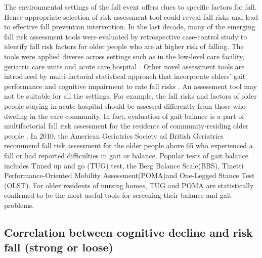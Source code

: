 \documentclass[conference,compsoc]{IEEEtran}
\begin{document}
The environmental settings of the fall event offers clues to specific factors for fall. Hence appropriate selection of risk assessment tool could reveal fall risks and lead to effective fall prevention intervention. In the last decade, many of the emerging fall risk assessment tools were evaluated by retrospective case-control study to identify fall risk factors for older people who are at higher risk of falling. The tools were applied diverse across settings such as in the low-level care facility\cite{van_Schooten_2020}, geriatric care units\cite{Michalcova_2020} and acute care hospital \cite{Chiu_2014, Aryee_2017}. Other novel assessment tools are introduced by multi-factorial statistical approach that incorporate elders' gait performance and cognitive impairment to rate fall risks \cite{Kikkert_2017,Taylor_2018}. An assessment tool may not be suitable for all the settings. For example, the fall risks and factors of older people staying in acute hospital should be assessed differently from those who dwellng in the care community. 
In fact, evaluation of gait balance is a part of multifactorial fall risk assessment for the residents of community-residing older people \cite{PreventionofFalls2011}. In 2010, the American Geriatrics Society ad British Geriatrics recommend fall risk assessment for the older people above 65 who experienced a fall or had reported difficulties in gait or balance. Popular tests of gait balance includes Timed up and go (TUG) test, the Berg Balance Scale(BBS), Tinetti Performance-Oriented Mobility Assessment(POMA)and One-Legged Stance Test (OLST). For older residents of nursing homes, TUG and POMA are statistically confirmed to be the most useful tools for screening their balance and gait problems\cite{Borowicz_2016}.

\subsection{Correlation between cognitive decline and risk fall (strong or loose)}
\begin{comment}
\textcolor{blue}{Executive function is the cognitive domain most commonly associated with gait dysfunction. Attention, sensory integration, and motor planning
are the sub-domains of executive function associated with risk of falls through gait dysfunction, whereas cognitive flexibility, judgement, and inhibitory control affect risk of falls through risk-taking behaviour\cite{Zhang_2019}}

\textcolor{blue}{Common tests of general sensori-motor function and balance in community-dwelling older adults include postural sway assessments, limit of stability tests, gait function (e.g. speed and variability), timed-up-and-go test (TUG), Berg Balance Scale, Tinetti Test and the physiological profile assessment (PPA). \cite{Carty_2014}}
\end{comment}
\end{document}
